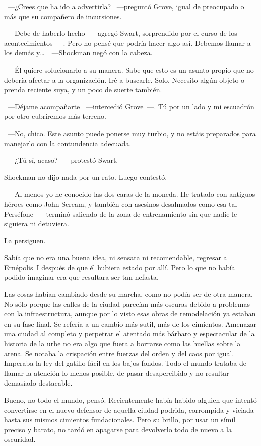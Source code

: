 ~---¿Crees que ha ido a advertirla? ~---preguntó Grove, igual de preocupado o más que su compañero de incursiones.

~---Debe de haberlo hecho ~---agregó Swart, sorprendido por el curso de los acontecimientos~---. Pero no pensé que podría hacer algo así. Debemos llamar a los demás y\dots\ ~---Shockman negó con la cabeza.

~---Él quiere solucionarlo a su manera. Sabe que esto es un asunto propio que no debería afectar a la organización. Iré a buscarle. Solo. Necesito algún objeto o prenda reciente suya, y un poco de suerte también.

~---Déjame acompañarte ~---intercedió Grove~---. Tú por un lado y mi escuadrón por otro cubriremos más terreno.

~---No, chico. Este asunto puede ponerse muy turbio, y no estáis preparados para manejarlo con la contundencia adecuada.

~---¿Tú sí, acaso? ~---protestó Swart.

Shockman no dijo nada por un rato. Luego contestó.

~---Al menos yo he conocido las dos caras de la moneda. He tratado con antiguos héroes como John Scream, y también con asesinos desalmados como esa tal Perséfone ~---terminó saliendo de la zona de entrenamiento sin que nadie le siguiera ni detuviera.

\parbreak
La persiguen.

Sabía que no era una buena idea, ni sensata ni recomendable, regresar a Ernépolis~I después de que él hubiera estado por allí. Pero lo que no había podido imaginar era que resultara ser tan nefasta.

Las cosas habían cambiado desde su marcha, como no podía ser de otra manera. No sólo porque las calles de la ciudad parecían más oscuras debido a problemas con la infraestructura, aunque por lo visto esas obras de remodelación ya estaban en su fase final. Se refería a un cambio más sutil, más de los cimientos. Amenazar una ciudad al completo y perpetrar el atentado más bárbaro y espectacular de la historia de la urbe no era algo que fuera a borrarse como las huellas sobre la arena. Se notaba la crispación entre fuerzas del orden y del caos por igual. Imperaba la ley del gatillo fácil en los bajos fondos. Todo el mundo trataba de llamar la atención lo menos posible, de pasar desapercibido y no resultar demasiado destacable.

Bueno, no todo el mundo, pensó. Recientemente había habido alguien que intentó convertirse en el nuevo defensor de aquella ciudad podrida, corrompida y viciada hasta sus mismos cimientos fundacionales. Pero su brillo, por usar un símil preciso y barato, no tardó en apagarse para devolverlo todo de nuevo a la oscuridad.

